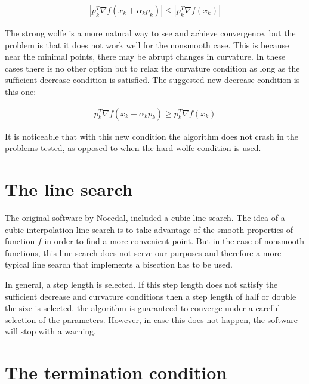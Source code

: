 \begin{equation}
  \begin{aligned}
    |p_k^T \nabla f(x_k + \alpha _k p_k)| \leq |p_k^T \nabla f(x_k)|
  \end{aligned}
\end{equation}

The strong wolfe is a more natural way to see and achieve convergence, but the problem is that it does not work well for the nonsmooth case. This is because near the minimal points, there may be abrupt changes in curvature. In these cases there is no other option but to relax the curvature condition as long as the sufficient decrease condition is satisfied. The suggested new decrease condition is this one:

\begin{equation}
  \begin{aligned}
    p_k^T \nabla f(x_k + \alpha _k p_k) \geq p_k^T \nabla f(x_k)
  \end{aligned}
\end{equation}

It is noticeable that with this new condition the algorithm does not crash in the problems tested, as opposed to when the hard wolfe condition is used.

\section{The line search}

The original software by Nocedal\citep{lbfgsbsoftware}, included a cubic line search. The idea of a cubic interpolation line search is to take advantage of the smooth properties of function $f$ in order to find a more convenient point. But in the case of nonsmooth functions, this line search does not serve our purposes and therefore a more typical line search that implements a bisection has to be used.

In general, a step length is selected. If this step length does not satisfy the sufficient decrease and curvature conditions then a step length of half or double the size is selected. the algorithm is guaranteed to converge under a careful selection of the parameters. However, in case this does not happen, the software will stop with a warning.

\section{The termination condition}

